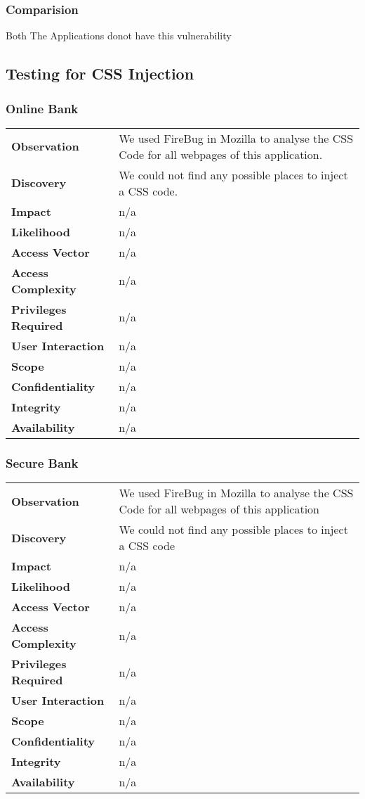 \subsubsection{Comparision}
Both The Applications donot have this vulnerability

\subsection{Testing for CSS Injection}
\subsubsection{Online Bank}
\begin{tabular}{l|p{10cm}}
\textbf{Observation} & We used FireBug in Mozilla to analyse the CSS Code for all webpages of this application.   \\
\textbf{Discovery} & We could not find any possible places to inject a CSS code. \\
\textbf{Impact} &  n/a\\
\textbf{Likelihood} & n/a \\
\textbf{Access Vector} & n/a \\
\textbf{Access Complexity} & n/a \\
\textbf{Privileges Required} & n/a \\
\textbf{User Interaction} & n/a \\
\textbf{Scope} & n/a \\
\textbf{Confidentiality} & n/a \\
\textbf{Integrity} & n/a \\
\textbf{Availability} & n/a \\
\end{tabular}

\subsubsection{Secure Bank}
\begin{tabular}{l|p{10cm}}
\textbf{Observation} &  We used FireBug in Mozilla to analyse the CSS Code for all webpages of this application  \\
\textbf{Discovery} & We could not find any possible places to inject a CSS code \\
\textbf{Impact} &  n/a\\
\textbf{Likelihood} & n/a \\
\textbf{Access Vector} & n/a \\
\textbf{Access Complexity} & n/a \\
\textbf{Privileges Required} & n/a \\
\textbf{User Interaction} & n/a \\
\textbf{Scope} & n/a \\
\textbf{Confidentiality} & n/a \\
\textbf{Integrity} & n/a \\
\textbf{Availability} & n/a \\
\end{tabular}

